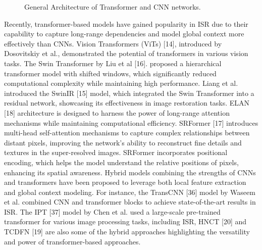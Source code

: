 \documentclass{ieeeaccess}
\begin{document}
\begin{figure}

    \centering
    \newlength{\xfigwd}
    \caption {General Architecture of Transformer and CNN networks.}

    \label{fig1}
\end{figure}

Recently, transformer-based models have gained popularity in ISR due to their capability to capture long-range dependencies and model global context more effectively than CNNs. Vision Transformers (ViTs) [14], introduced by Dosovitskiy et al., demonstrated the potential of transformers in various vision tasks. The Swin Transformer by Liu et al [16]. proposed a hierarchical transformer model with shifted windows, which significantly reduced computational complexity while maintaining high performance. Liang et al. introduced the SwinIR [15] model, which integrated the Swin Transformer into a residual network, showcasing its effectiveness in image restoration tasks. ELAN [18] architecture is designed to harness the power of long-range attention mechanisms while maintaining computational efficiency. SRFormer [17] introduces multi-head self-attention mechanisms to capture complex relationships between distant pixels, improving the network's ability to reconstruct fine details and textures in the super-resolved images. SRFormer incorporates positional encoding, which helps the model understand the relative positions of pixels, enhancing its spatial awareness. 
Hybrid models combining the strengths of CNNs and transformers have been proposed to leverage both local feature extraction and global context modeling. For instance, the TransCNN [36] model by Waseem et al. combined CNN and transformer blocks to achieve state-of-the-art results in ISR. The IPT [37] model by Chen et al. used a large-scale pre-trained transformer for various image processing tasks, including ISR, HNCT [20] and TCDFN [19] are also some of the hybrid approaches highlighting the versatility and power of transformer-based approaches.
\end{document}

